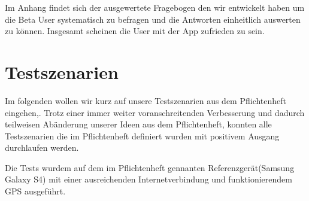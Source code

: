 \documentclass{scrartcl}
\begin{document}
		Im Anhang findet sich der ausgewertete Fragebogen den wir entwickelt haben um die Beta User systematisch zu befragen und die Antworten einheitlich auswerten zu können. Insgesamt scheinen die User mit der App zufrieden zu sein.

\newpage
\section{Testszenarien}
Im folgenden wollen wir kurz auf unsere Testszenarien aus dem Pflichtenheft eingehen,.
Trotz einer immer weiter voranschreitenden Verbesserung und dadurch teilweisen Abänderung unserer Ideen aus dem Pflichtenheft, konnten alle Testszenarien die im Pflichtenheft definiert wurden mit positivem Ausgang durchlaufen werden.

Die Tests wurdem auf dem im Pflichtenheft gennanten Referenzgerät(Samsung Galaxy S4) mit einer ausreichenden Internetverbindung und funktionierendem GPS ausgeführt. \newline
\end{document}
